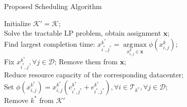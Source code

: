 \documentclass[presentation,professionalfonts]{beamer}
\DeclareMathOperator*{\argmax}{\arg\!\max}
\begin{document}
\newcommand{\flambdas}{\lambda^{k, 0}_{i, j} + \lambda^{k, 1}_{i, j}}
\newcommand{\fsmember}{\flambdas M^{\left(c^k_{i, j} + e^k_{i, j}\right)}}
\newcommand{\rplus}{\mathbf{R}^{+}}


\begin{frame}{Proposed Scheduling Algorithm}
  \begin{algorithm}[H]

    Initialize \(\mathcal{K}' = \mathcal{K}\); \\
     {
      Solve the tractable LP problem, obtain assignment \(\bm{x}\); \\
      Find largest completion time: \(x_{i^*, j^*}^{k^*} = \argmax\limits_{x_{i, j}^k \in\bm{x}}\phi\left(x_{i, j}^k\right)\); \\
      Fix \(x_{i^*, j}^{k^*},\forall j\in\mathcal{D}\); Remove them from \(\bm{x}\); \\
      Reduce resource capacity of the corresponding datacenter; \\
      Set \(\phi\left(x^{k^*}_{i, j}\right) = x^{k^*}_{i, j}\left(c^{k^*}_{i^*, j^*} + e^{k^*}_{i^*, j^*}\right),\forall i\in \mathcal{T}_{k^*}, \forall j\in \mathcal{D}\); \\
      Remove \(k^*\) from \(\mathcal{K}'\)
    }
  \end{algorithm}
\end{frame}
\end{document}
